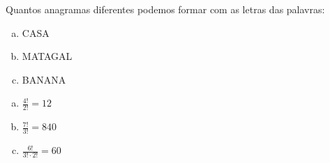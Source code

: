 \begin{ex}
 Quantos anagramas diferentes podemos formar com as letras das palavras:
    \begin{enumerate}[(a)]
    \item CASA
    \item MATAGAL
    \item BANANA
    \end{enumerate}
      \begin{sol}
       \phantom{A}
         \begin{enumerate} [(a)]
             \item $\frac{4!}{2!}=12$
             \item $\frac{7!}{3!}=840$
             \item $\frac{6!}{3!\cdot2!}=60$
         \end{enumerate}
      \end{sol}
\end{ex}